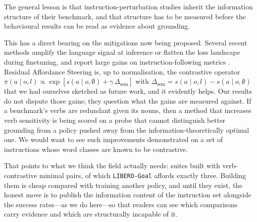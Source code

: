 \documentclass[11pt]{article}
\begin{document}
The general lesson is that instruction-perturbation studies inherit the information
structure of their benchmark, and that structure has to be measured before the
behavioural results can be read as evidence about grounding.

This has a direct bearing on the mitigations now being proposed. Several recent
methods amplify the language signal at inference or flatten the loss landscape during
finetuning, and report large gains on instruction-following metrics
\citep{zhan2026stable,zhang2026flatness}. Residual Affordance Steering
\citep{zhan2026stable} is, up to normalisation, the contrastive operator
$\pi(a\mid o,l) \propto \exp[s(a\mid o,\emptyset) + \gamma\,\Delta_{\text{sem}}]$ with
$\Delta_{\text{sem}} = s(a\mid o,l) - s(a\mid o,\emptyset)$ that we had ourselves
sketched as future work, and it evidently helps. Our results do not dispute those
gains; they question what the gains are measured against. If a benchmark's verbs are
redundant given its nouns, then a method that increases verb sensitivity is being
scored on a probe that cannot distinguish better grounding from a policy pushed away
from the information-theoretically optimal one. We would want to see such
improvements demonstrated on a set of instructions whose word classes are known to be
contrastive.

That points to what we think the field actually needs: suites built with
verb-contrastive minimal pairs, of which \texttt{LIBERO-Goal} affords exactly three.
Building them is cheap compared with training another policy, and until they exist,
the honest move is to publish the information content of the instruction set
alongside the success rates---as we do here---so that readers can see which
comparisons carry evidence and which are structurally incapable of it.
\end{document}
